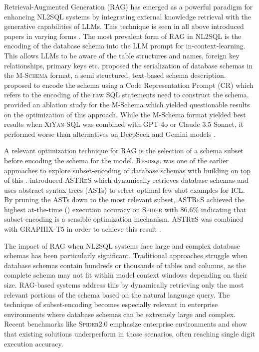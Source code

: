 Retrieval-Augmented Generation (RAG) has emerged as a powerful paradigm for enhancing NL2SQL systems by integrating
external knowledge retrieval with the generative capabilities of LLMs. This technique is seen in all above introduced
papers in varying forms \citep{XiYan, CHASE, CoE-SQL, MAGIC, DINSQL, DAIL-SQL}. The most prevalent form of RAG in
NL2SQL is the encoding of the database schema into the LLM prompt for in-context-learning. This allows LLMs to be
aware of the table structures and names, foreign key relationships, primary keys etc. \cite{XiYan} proposed the
serialization of database schemas in the \textsc{M-Schema} format, a semi structured, text-based schema description.
\cite{DAIL-SQL} proposed to encode the schema using a Code Representation Prompt (CR) which refers to the encoding of
the raw SQL statements need to construct the schema. \cite{XiYan} provided an ablation study for the M-Schema which
yielded questionable results on the optimization of this approach. While the M-Schema format yielded best results when
\textsc{XiYan-SQL} was combined with GPT-4o or Claude 3.5 Sonnet, it performed worse than alternatives on DeepSeek
and Gemini models \citep{XiYan}.

A relevant optimization technique for RAG is the selection of a schema subset before encoding the schema for the model.
\textsc{Resdsql} was one of the earlier approaches to explore subset-encoding of database schemas with \cite{RetAug}
building on top of this \citep{RetAug, RESDSQL}. \cite{RetAug} introduced \textsc{ASTReS} which dynamically
retrieves database schemas and uses abstract syntax trees (ASTs) to select optimal few-shot examples for ICL. 
By pruning the ASTs down to the most relevant subset, \textsc{ASTReS} achieved the highest at-the-time (\citeyear{RetAug})
execution accuracy on \textsc{Spider} with 86.6\% indicating that subset-encoding is a sensible optimization mechanism.
\textsc{ASTReS} was combined with GRAPHIX-T5 in order to achieve this result \citep{RetAug}.

The impact of RAG when NL2SQL systems face large and complex database schemas has been particularly significant. Traditional
approaches struggle when database schemas contain hundreds or thousands of tables and columns, as the complete schema may not
fit within model context windows depending on their size. RAG-based systems address this by dynamically retrieving only the most
relevant portions of the schema based on the natural language query. The technique of subset-encoding becomes especially relevant
in enterprise environments where database schemas can be extremely large and complex. Recent benchmarks like \textsc{Spider2.0}
emphasize enterprise environments and show that existing solutions underperform in those scenarios, often reaching single digit
execution accuracy.

